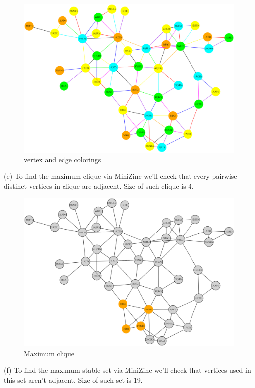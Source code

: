 \documentclass{article}
\begin{document}
	\begin{figure}[h]
		\centering
		\includegraphics[width=1\textwidth]{v_e_coloring.png}
		\caption{vertex and edge colorings}
	\end{figure}\newpage
	(e) To find the maximum clique via MiniZinc we'll check that every pairwise distinct vertices in clique are adjacent. Size of such clique is 4.
	\begin{figure}[h]
		\centering
		\includegraphics[width=1\textwidth]{clique.png}
		\caption{Maximum clique}
	\end{figure}\newpage
	(f) To find the maximum stable set via MiniZinc we'll check that vertices used in this set aren't adjacent. Size of such set is 19.
\end{document}
